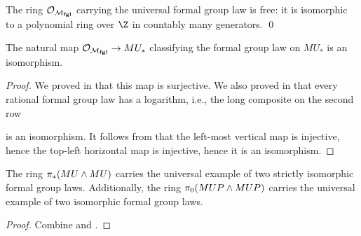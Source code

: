\begin{theorem}\label{DummyLazardsThm}
The ring \(\mathcal{O}_{\mathcal{M}_{\mathbf{fgl}}}\) carrying the universal formal group law is free: it is isomorphic to a polynomial ring over \(\Z\) in countably many generators. \qed
\end{theorem}

\begin{corollary}\label{QuillensTheorem}
The natural map \(\mathcal{O}_{\mathcal{M}_{\mathbf{fgl}}} \to MU_*\) classifying the formal group law on \(MU_*\) is an isomorphism.
\end{corollary}
\begin{proof}
We proved in  that this map is surjective.  We also proved in  that every rational formal group law has a logarithm, i.e., the long composite on the second row
\begin{center}
\end{center}
is an isomorphism.  It follows from  that the left-most vertical map is injective, hence the top-left horizontal map is injective, hence it is an isomorphism.
\end{proof}

\begin{corollary}
The ring \(\pi_*(MU \wedge MU)\) carries the universal example of two strictly isomorphic formal group laws.  Additionally, the ring \(\pi_0 (MUP \wedge MUP)\) carries the universal example of two isomorphic formal group laws.
\end{corollary}
\begin{proof}
Combine  and .
\end{proof}


























